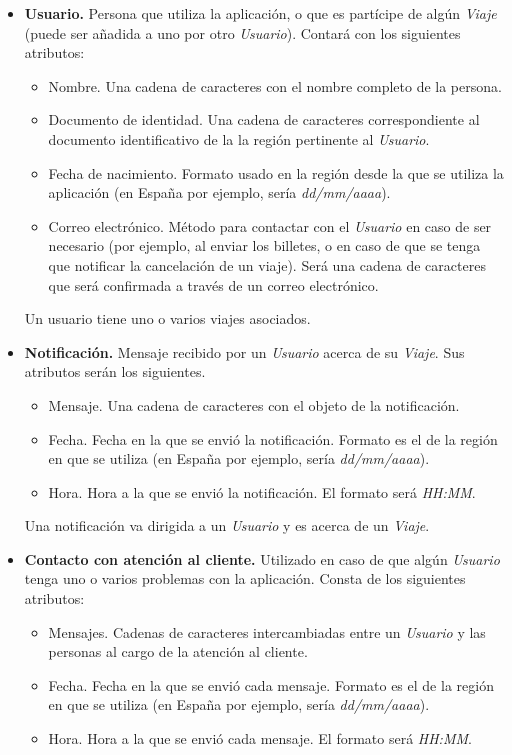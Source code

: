 \begin{itemize}
    \item \textbf{Usuario.} Persona que utiliza la aplicación, o que es partícipe de algún \textit{Viaje} (puede ser
        añadida a uno por otro \textit{Usuario}). Contará con los siguientes atributos:
        \begin{itemize}
            \item Nombre. Una cadena de caracteres con el nombre completo de la persona.
            \item Documento de identidad. Una cadena de caracteres correspondiente al documento identificativo de la
                la región pertinente al \textit{Usuario}.
            \item Fecha de nacimiento. Formato usado en la región desde la que se utiliza la aplicación (en España por ejemplo,
                sería \textit{dd/mm/aaaa}).
            \item Correo electrónico. Método para contactar con el \textit{Usuario} en caso de ser necesario (por ejemplo, al
                enviar los billetes, o en caso de que se tenga que notificar la cancelación de un viaje). Será una cadena de
                caracteres que será confirmada a través de un correo electrónico.
        \end{itemize}
        Un usuario tiene uno o varios viajes asociados.
    
    \item \textbf{Notificación.} Mensaje recibido por un \textit{Usuario} acerca de su \textit{Viaje}. Sus atributos serán los siguientes.
        \begin{itemize}
            \item Mensaje. Una cadena de caracteres con el objeto de la notificación.
            \item Fecha. Fecha en la que se envió la notificación. Formato es el de la región en que se utiliza (en España por ejemplo,
                sería \textit{dd/mm/aaaa}).
            \item Hora. Hora a la que se envió la notificación. El formato será \textit{HH:MM}.
        \end{itemize}

        Una notificación va dirigida a un \textit{Usuario} y es acerca de un \textit{Viaje}.
    
    \item \textbf{Contacto con atención al cliente.} Utilizado en caso de que algún \textit{Usuario} tenga uno o varios problemas con la aplicación. Consta
        de los siguientes atributos:
        \begin{itemize}
            \item Mensajes. Cadenas de caracteres intercambiadas entre un \textit{Usuario} y las personas al cargo de la atención al cliente.
            \item Fecha. Fecha en la que se envió cada mensaje. Formato es el de la región en que se utiliza (en España por ejemplo,
                sería \textit{dd/mm/aaaa}).
            \item Hora. Hora a la que se envió cada mensaje. El formato será \textit{HH:MM}.
        \end{itemize}


\end{itemize}
